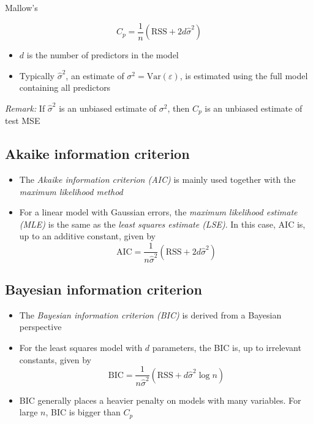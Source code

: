 \documentclass[]{article}
\providecommand{\tightlist}{%
  \setlength{\itemsep}{0pt}\setlength{\parskip}{0pt}}
\begin{document}
Mallow's

\begin{equation}
C_{p}=\frac{1}{n}\left( \textrm{RSS}+2d\hat{\sigma}^{2}\right)
\end{equation}

\begin{itemize}
\tightlist
\item
  \(d\) is the number of predictors in the model
\item
  Typically \(\hat{\sigma}^{2}\), an estimate of
  \(\sigma^2=\textrm{Var}(\varepsilon)\), is estimated using the full
  model containing all predictors
\end{itemize}

\emph{Remark:} If \(\hat{\sigma}^{2}\) is an unbiased estimate of
\(\sigma^{2}\), then \(C_{p}\) is an unbiased estimate of test MSE

\subsection{Akaike information
criterion}\label{akaike-information-criterion}

\begin{itemize}
\tightlist
\item
  The \emph{Akaike information criterion (AIC)} is mainly used together
  with the \emph{maximum likelihood method}
\item
  For a linear model with Gaussian errors, the \emph{maximum likelihood
  estimate (MLE)} is the same as the \emph{least squares estimate
  (LSE)}. In this case, AIC is, up to an additive constant, given by \[
  \textrm{AIC}=\frac{1}{n\hat{\sigma}^{2}}\left(  \textrm{RSS}+2d\hat{\sigma}^{2}\right)
  \]
\end{itemize}

\subsection{Bayesian information
criterion}\label{bayesian-information-criterion}

\begin{itemize}
\tightlist
\item
  The \emph{Bayesian information criterion (BIC)} is derived from a
  Bayesian perspective
\item
  For the least squares model with \(d\) parameters, the BIC is, up to
  irrelevant constants, given by \[
  \textrm{BIC}=\frac{1}{n\hat{\sigma}^{2}}\left( \textrm{RSS}+d\hat{\sigma}^{2}\log n\right)
  \]
\item
  BIC generally places a heavier penalty on models with many variables.
  For large \(n\), BIC is bigger than \(C_{p}\)
\end{itemize}
\end{document}
